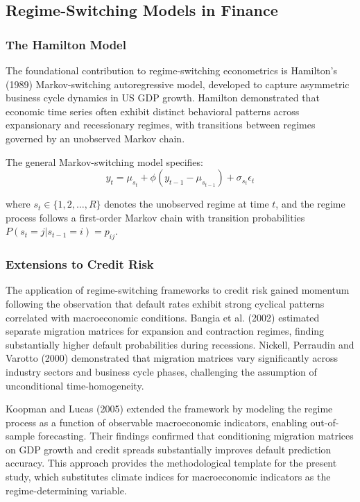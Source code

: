 \documentclass[12pt,a4paper]{article}
\begin{document}
\subsection{Regime-Switching Models in Finance}

\subsubsection{The Hamilton Model}

The foundational contribution to regime-switching econometrics is Hamilton's (1989) Markov-switching autoregressive model, developed to capture asymmetric business cycle dynamics in US GDP growth. Hamilton demonstrated that economic time series often exhibit distinct behavioral patterns across expansionary and recessionary regimes, with transitions between regimes governed by an unobserved Markov chain.

The general Markov-switching model specifies:
\begin{equation}
y_t = \mu_{s_t} + \phi(y_{t-1} - \mu_{s_{t-1}}) + \sigma_{s_t}\epsilon_t
\end{equation}

where $s_t \in \{1, 2, \ldots, R\}$ denotes the unobserved regime at time $t$, and the regime process follows a first-order Markov chain with transition probabilities $P(s_t = j | s_{t-1} = i) = p_{ij}$.

\subsubsection{Extensions to Credit Risk}

The application of regime-switching frameworks to credit risk gained momentum following the observation that default rates exhibit strong cyclical patterns correlated with macroeconomic conditions. Bangia et al. (2002) estimated separate migration matrices for expansion and contraction regimes, finding substantially higher default probabilities during recessions. Nickell, Perraudin and Varotto (2000) demonstrated that migration matrices vary significantly across industry sectors and business cycle phases, challenging the assumption of unconditional time-homogeneity.

Koopman and Lucas (2005) extended the framework by modeling the regime process as a function of observable macroeconomic indicators, enabling out-of-sample forecasting. Their findings confirmed that conditioning migration matrices on GDP growth and credit spreads substantially improves default prediction accuracy. This approach provides the methodological template for the present study, which substitutes climate indices for macroeconomic indicators as the regime-determining variable.
\end{document}
